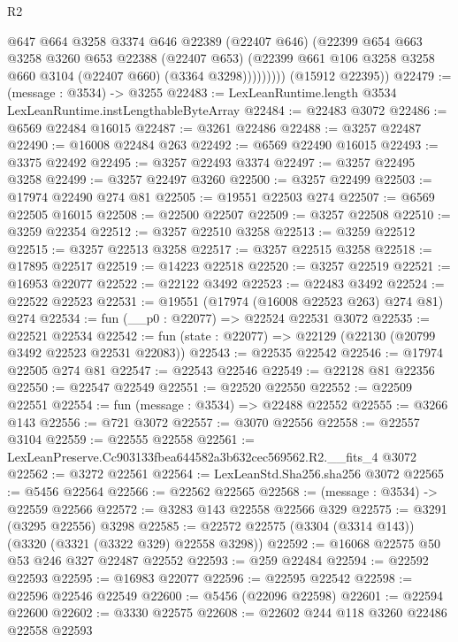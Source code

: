 \begin{lexlean}{R2}
\begin{coremodule}
                  @647
                  @664
                  @3258
                  @3374
                  @646
                  @22389
                  (@22407 @646)
                  (@22399
                    @654
                    @663
                    @3258
                    @3260
                    @653
                    @22388
                    (@22407 @653)
                    (@22399 @661 @106 @3258 @3258 @660 @3104 (@22407 @660) (@3364 @3298)))))))))
      (@15912 @22395))
@22479 := (message : @3534) -> @3255
@22483 := LexLeanRuntime.length @3534 LexLeanRuntime.instLengthableByteArray
@22484 := @22483 @3072
@22486 := @6569 @22484 @16015
@22487 := @3261 @22486
@22488 := @3257 @22487
@22490 := @16008 @22484 @263
@22492 := @6569 @22490 @16015
@22493 := @3375 @22492
@22495 := @3257 @22493 @3374
@22497 := @3257 @22495 @3258
@22499 := @3257 @22497 @3260
@22500 := @3257 @22499
@22503 := @17974 @22490 @274 @81
@22505 := @19551 @22503 @274
@22507 := @6569 @22505 @16015
@22508 := @22500 @22507
@22509 := @3257 @22508
@22510 := @3259 @22354
@22512 := @3257 @22510 @3258
@22513 := @3259 @22512
@22515 := @3257 @22513 @3258
@22517 := @3257 @22515 @3258
@22518 := @17895 @22517
@22519 := @14223 @22518
@22520 := @3257 @22519
@22521 := @16953 @22077
@22522 := @22122 @3492
@22523 := @22483 @3492
@22524 := @22522 @22523
@22531 := @19551 (@17974 (@16008 @22523 @263) @274 @81) @274
@22534 := fun (__p0 : @22077) => @22524 @22531 @3072
@22535 := @22521 @22534
@22542 := fun (state : @22077) => @22129 (@22130 (@20799 @3492 @22523 @22531 @22083))
@22543 := @22535 @22542
@22546 := @17974 @22505 @274 @81
@22547 := @22543 @22546
@22549 := @22128 @81 @22356
@22550 := @22547 @22549
@22551 := @22520 @22550
@22552 := @22509 @22551
@22554 := fun (message : @3534) => @22488 @22552
@22555 := @3266 @143
@22556 := @721 @3072
@22557 := @3070 @22556
@22558 := @22557 @3104
@22559 := @22555 @22558
@22561 := LexLeanPreserve.Cc903133fbea644582a3b632cec569562.R2.__fits_4 @3072
@22562 := @3272 @22561
@22564 := LexLeanStd.Sha256.sha256 @3072
@22565 := @5456 @22564
@22566 := @22562 @22565
@22568 := (message : @3534) -> @22559 @22566
@22572 := @3283 @143 @22558 @22566 @329
@22575 := @3291 (@3295 @22556) @3298
@22585 := @22572 @22575 (@3304 (@3314 @143)) (@3320 (@3321 (@3322 @329) @22558 @3298))
@22592 := @16068 @22575 @50 @53 @246 @327 @22487 @22552
@22593 := @259 @22484
@22594 := @22592 @22593
@22595 := @16983 @22077
@22596 := @22595 @22542
@22598 := @22596 @22546 @22549
@22600 := @5456 (@22096 @22598)
@22601 := @22594 @22600
@22602 := @3330 @22575
@22608 := @22602 @244 @118 @3260 @22486 @22558 @22593

\end{coremodule}
\end{lexlean}
